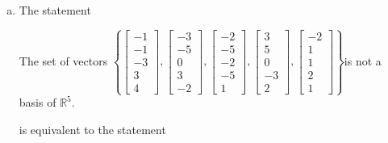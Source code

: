 \begin{exerciseAnswer}
\begin{enumerate}[(a)]
\item The statement 
\begin{center}\begin{minipage}{0.8\textwidth}
 The set of vectors \( \left\{ \left[\begin{array}{c}
-1 \\
-1 \\
-3 \\
3 \\
4
\end{array}\right] , \left[\begin{array}{c}
-3 \\
-5 \\
0 \\
3 \\
-2
\end{array}\right] , \left[\begin{array}{c}
-2 \\
-5 \\
-2 \\
-5 \\
1
\end{array}\right] , \left[\begin{array}{c}
3 \\
5 \\
0 \\
-3 \\
2
\end{array}\right] , \left[\begin{array}{c}
-2 \\
1 \\
1 \\
2 \\
1
\end{array}\right] \right\} \)is not a basis of \(\mathbb{R}^5\). 
\end{minipage}\end{center}
     is equivalent to the statement 
\begin{center}\begin{minipage}{0.8\textwidth}
 The set of vectors \( \left\{ \left[\begin{array}{c}
-1 \\
-1 \\
-3 \\
3 \\
4
\end{array}\right] , \left[\begin{array}{c}
-3 \\
-5 \\

\end{array}
\end{minipage}
\end{center}
\end{enumerate}
\end{exerciseAnswer}

